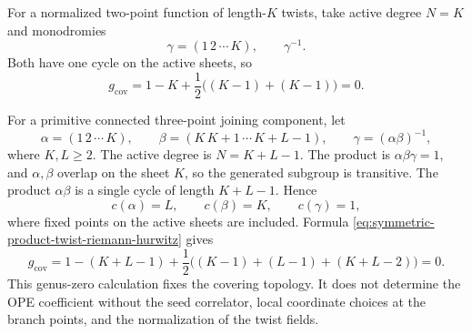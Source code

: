 \begin{example}
\label{ex:symmetric-product-basic-cover}
For a normalized two-point function of length-\(K\) twists, take active degree
\(N=K\) and monodromies
\[
  \gamma=(1\,2\,\cdots\,K),
  \qquad
  \gamma^{-1}.
\]
Both have one cycle on the active sheets, so
\begin{equation}
  g_{\mathrm{cov}}
  =
  1-K+\frac12\bigl((K-1)+(K-1)\bigr)=0.
  \label{eq:symmetric-product-two-point-cover-genus}
\end{equation}

For a primitive connected three-point joining component, let
\begin{equation}
  \alpha=(1\,2\,\cdots\,K),
  \qquad
  \beta=(K\,K+1\,\cdots\,K+L-1),
  \qquad
  \gamma=(\alpha\beta)^{-1},
  \label{eq:symmetric-product-primitive-join-monodromies}
\end{equation}
where \(K,L\ge2\).  The active degree is \(N=K+L-1\).  The product is
\(\alpha\beta\gamma=1\), and \(\alpha,\beta\) overlap on the sheet \(K\), so
the generated subgroup is transitive.  The product \(\alpha\beta\) is a single
cycle of length \(K+L-1\).  Hence
\[
  c(\alpha)=L,\qquad
  c(\beta)=K,\qquad
  c(\gamma)=1,
\]
where fixed points on the active sheets are included.  Formula
\eqref{eq:symmetric-product-twist-riemann-hurwitz} gives
\begin{equation}
  g_{\mathrm{cov}}
  =
  1-(K+L-1)+\frac12\bigl((K-1)+(L-1)+(K+L-2)\bigr)=0.
  \label{eq:symmetric-product-primitive-join-genus}
\end{equation}
This genus-zero calculation fixes the covering topology.  It does not determine
the OPE coefficient without the seed correlator, local coordinate choices at
the branch points, and the normalization of the twist fields.
\end{example}

